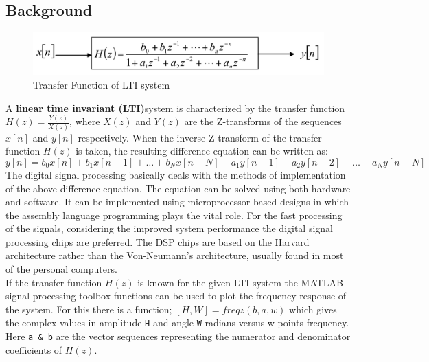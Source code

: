 \documentclass[a4paper,11pt]{article}
\newcommand\ddfrac[2]{\frac{\displaystyle #1}{\displaystyle #2}}
\begin{document}
\subsection{Background}
\begin{figure}[H]
    \centering
    \includegraphics[width=0.8\linewidth]{./FIG/back_eq.png}
    \caption{Transfer Function of LTI system}
\end{figure}
A \textbf{linear time invariant (LTI)}system is characterized by the transfer function $H(z)=\ddfrac{Y(z)}{X(z)}$,
where $X(z)$ and $Y(z)$ are the Z-transforms of the sequences $x[n]$ and $y[n]$ respectively. When the
inverse Z-transform of the transfer function $H(z)$ is taken, the resulting difference equation can be written as:
\begin{equation*}
    y[n]=b_0x[n]+b_1x[n-1]+\dots+b_Nx[n-N]-a_1y[n-1]-a_2y[n-2]-\dots-a_Ny[n-N]
\end{equation*}
The digital signal processing basically deals with the methods of implementation of the above
difference equation. The equation can be solved using both hardware and software. It can be
implemented using microprocessor based designs in which the assembly language programming
plays the vital role. For the fast processing of the signals, considering the improved system
performance the digital signal processing chips are preferred. The DSP chips are based on the
Harvard architecture rather than the Von-Neumann's architecture, usually found in most of the
personal computers.\\

If the transfer function $H(z)$ is known for the given LTI system the MATLAB signal processing
toolbox functions can be used to plot the frequency response of the system. For this there is a
function; $[H, W]= freqz(b, a, w) $ which gives the complex values in amplitude \texttt{H} and angle \texttt{W} radians versus w points frequency. Here \texttt{a \& b} are the vector sequences representing the
numerator and denominator coefficients of $H(z)$.
\end{document}
